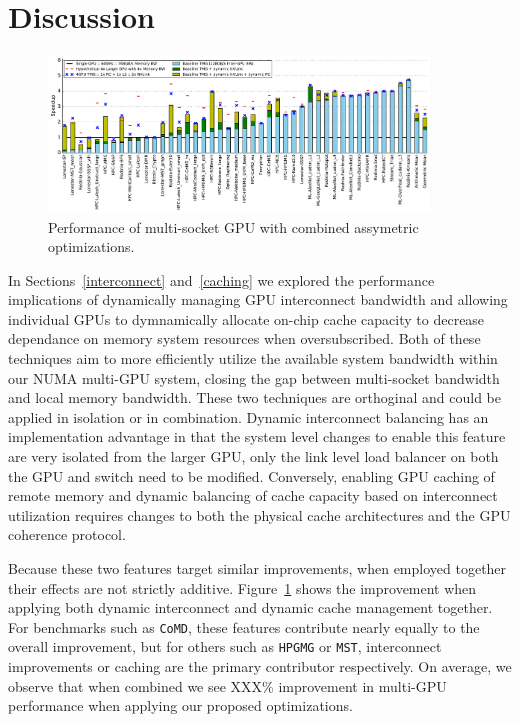 \section {Discussion}

\label{discussion}
\begin{figure}[tp]
    \centering
    \includegraphics[width=0.9\textwidth]{figures/plot_final_speedup_WB_nvlink_first.pdf}
    \caption{Performance of multi-socket GPU with combined assymetric 
optimizations.}
    \label{fig:combined}
\end{figure}

In Sections~\ref{interconnect} and~\ref{caching} we explored the performance 
implications of dynamically managing GPU interconnect bandwidth and allowing 
individual GPUs to dymnamically allocate on-chip cache capacity to decrease 
dependance on memory system resources when oversubscribed.  Both of these 
techniques aim to more efficiently utilize the available system bandwidth within 
our NUMA multi-GPU system, closing the gap between multi-socket bandwidth and 
local memory bandwidth.  These two techniques are orthoginal and could be 
applied in isolation or in combination.  Dynamic interconnect balancing has an 
implementation advantage in that the system level changes to enable this feature 
are very isolated from the larger GPU, only the link level load balancer on both 
the GPU and switch need to be modified.  Conversely, enabling GPU caching of 
remote memory and dynamic balancing of cache capacity based on interconnect 
utilization requires changes to both the physical cache architectures and the 
GPU coherence protocol.

Because these two features target similar improvements, when employed together 
their effects are not strictly additive.  Figure~\ref{fig:combined} shows the 
improvement when applying both dynamic interconnect and dynamic cache management 
together.  For benchmarks such as \texttt{CoMD}, these features contribute 
nearly equally to the overall improvement, but for others such as 
\texttt{HPGMG} or \texttt{MST}, interconnect improvements or caching are the 
primary contributor respectively.  On average, we observe that when combined we 
see XXX\% improvement in multi-GPU performance when applying our proposed 
optimizations.

